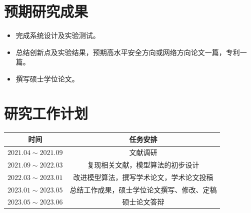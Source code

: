 \documentclass[degree=master,cjk-font=noto]{thuthesis}
\begin{document}
\chapter{预期研究成果}

\begin{itemize}
	\item 完成系统设计及实验测试。
	\item 总结创新点及实验结果，预期高水平安全方向或网络方向论文一篇，专利一篇。
	\item 撰写硕士学位论文。
\end{itemize}

\chapter{研究工作计划}


\begin{table}[htb]
  \centering
  \label{tab:plan}
  \begin{tabular}{cc}
    \toprule
    \textbf{时间}         & \textbf{任务安排}  \\
    \midrule
    $2021.04 \sim 2021.09$ & 文献调研 \\
    $2021.09 \sim 2022.03$ & 复现相关文献，模型算法的初步设计 \\
    $2022.03 \sim 2023.01$ & 改进模型算法，撰写学术论文，学术论文投稿 \\
    $2023.01 \sim 2023.05$ & 总结工作成果，硕士学位论文撰写、修改、定稿\\
    $2023.05 \sim 2023.06$ & 硕士论文答辩 \\
    \bottomrule
  \end{tabular}
\end{table}

\backmatter


\appendix
\end{document}
